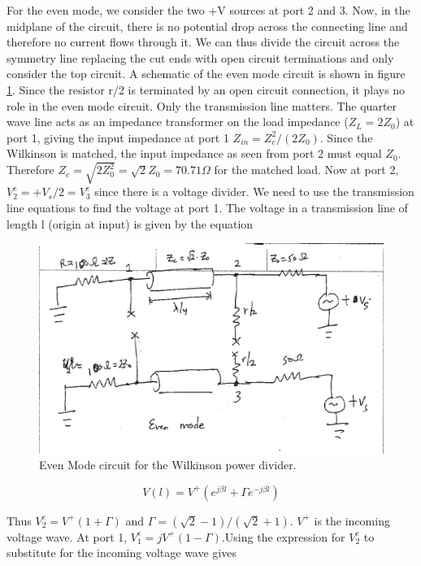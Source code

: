 \documentclass[twocolumn, aps, apl]{revtex4-1}
\begin{document}
For the even mode, we consider the two +V sources at port 2 and 3. Now, in the midplane of the circuit, there is no potential drop across the connecting line and therefore no current flows through it. We can thus divide the circuit across the symmetry line replacing the cut ends with open circuit terminations and only consider the top circuit. A schematic of the even mode circuit is shown in figure \ref{fig:evenmode}. Since the resistor r/2 is terminated by an open circuit connection, it plays no role in the even mode circuit. Only the transmission line matters. The quarter wave line acts as an impedance transformer on the load impedance ($Z_L =2 Z_0$) at port 1, giving the input impedance at port 1 $Z_{in} = Z_c^2/(2 Z_0)$. Since the Wilkinson is matched, the input impedance as seen from port 2 must equal $Z_0$. Therefore $Z_c = \sqrt{2 Z_0^2} = \sqrt{2} Z_0 = 70.71 \Omega$ for the matched load. Now at port 2, $V_2^e = + V_s/2 = V_3^e$ since there is a voltage divider. We need to use the transmission line equations to find the voltage at port 1. The voltage in a transmission line of length l (origin at input) is given by the equation

\begin{figure}[!htbp]
    \centering
    \includegraphics[scale=0.2]{EvenMode.png}
    \caption{Even Mode circuit for the Wilkinson power divider. }
    \label{fig:evenmode}
\end{figure}


\begin{equation}
    V(l) = V^+ \left(e^{j \beta l} + \Gamma e^{-j \beta l}\right)
\end{equation}

Thus $V_2^e = V^+ \left(1 + \Gamma \right)$ and $\Gamma = (\sqrt{2} - 1)/(\sqrt{2} + 1)$. $V^+$ is the incoming voltage wave. At port 1, $V_1^e = j V^+ \left(1 - \Gamma \right) $.Using the expression for $V_2^e$ to substitute for the incoming voltage wave gives
\end{document}
